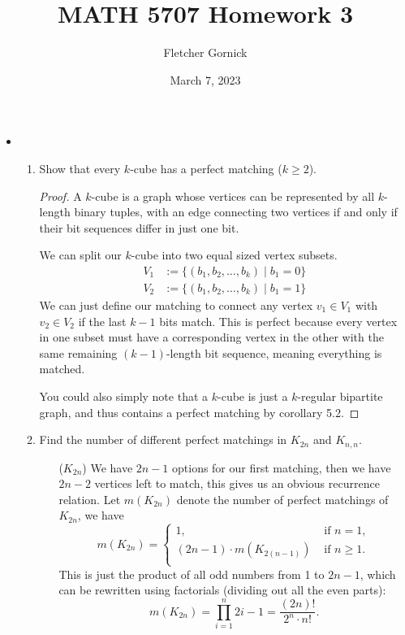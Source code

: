 \documentclass[11pt]{article}
\title{\vspace{-1.0cm}MATH 5707 Homework 3}
\author{Fletcher Gornick}
\date{March 7, 2023}
\newcommand\itm[1]{\item[\textbf{#1}]}
\newcommand{\n}{\vspace{0.3cm}}
\begin{document}
\maketitle
\begin{itemize}
  \itm{5.1.1} \begin{enumerate}[label=(\alph*)]
    \item Show that every \(k\)-cube has a perfect matching (\(k \geq 2\)).
      \begin{proof}
        A \(k\)-cube is a graph whose vertices can be represented by all \(k\)-length binary tuples, with an edge connecting two vertices if and only if their bit sequences differ in just one bit.

        We can split our \(k\)-cube into two equal sized vertex subsets.
        \begin{align*}
          V_1 &:= \{(b_1,b_2,\hdots,b_k) \mid b_1 = 0\} \\
          V_2 &:= \{(b_1,b_2,\hdots,b_k) \mid b_1 = 1\}
        \end{align*}
        We can just define our matching to connect any vertex \(v_1 \in V_1\) with \(v_2 \in V_2\) if the last \(k-1\) bits match.  This is perfect because every vertex in one subset must have a corresponding vertex in the other with the same remaining \((k-1)\)-length bit sequence, meaning everything is matched. \n

        You could also simply note that a \(k\)-cube is just a \(k\)-regular bipartite graph, and thus contains a perfect matching by corollary 5.2.
      \end{proof}
      
    \item Find the number of different perfect matchings in \(K_{2n}\) and \(K_{n,n}\).
      \begin{itemize}
        \item[(\(K_{2n}\))] We have \(2n-1\) options for our first matching, then we have \(2n-2\) vertices left to match, this gives us an obvious recurrence relation.  Let \(m(K_{2n})\) denote the number of perfect matchings of \(K_{2n}\), we have
          \[ m(K_{2n}) =
            \begin{cases}
              1, &\text{ if } n = 1, \\
              (2n-1) \cdot m(K_{2(n-1)}) &\text{ if } n \geq 1. \\
            \end{cases}
          \]
          This is just the product of all odd numbers from 1 to \(2n-1\), which can be rewritten using factorials (dividing out all the even parts):
          \[m(K_{2n}) = \prod_{i=1}^n 2i-1 = \frac{(2n)!}{2^n \cdot n!}.\]


\end{itemize}
\end{enumerate}
\end{itemize}
\end{document}
